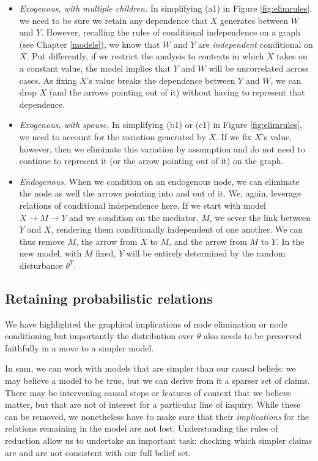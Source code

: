 \documentclass[
  12pt,
]{book}
\providecommand{\tightlist}{%
  \setlength{\itemsep}{0pt}\setlength{\parskip}{0pt}}
\begin{document}
\begin{itemize}
\tightlist
\item
  \emph{Exogenous, with multiple children.} In simplifying (a1) in Figure \ref{fig:elimrules}, we need to be sure we retain any dependence that \(X\) generates between \(W\) and \(Y\). However, recalling the rules of conditional independence on a graph (see Chapter \ref{models}), we know that \(W\) and \(Y\) are \emph{independent} conditional on \(X\). Put differently, if we restrict the analysis to contexts in which \(X\) takes on a constant value, the model implies that \(Y\) and \(W\) will be uncorrelated across cases. As fixing \(X\)'s value breaks the dependence between \(Y\) and \(W\), we can drop \(X\) (and the arrows pointing out of it) without having to represent that dependence.
\item
  \emph{Exogenous, with spouse.} In simplifying (b1) or (c1) in Figure \ref{fig:elimrules}, we need to account for the variation generated by \(X\). If we fix \(X\)'s value, however, then we eliminate this variation by assumption and do not need to continue to represent it (or the arrow pointing out of it) on the graph.
\item
  \emph{Endogenous.} When we condition on an endogenous node, we can eliminate the node as well the arrows pointing into and out of it. We, again, leverage relations of conditional independence here. If we start with model \(X \rightarrow M \rightarrow Y\) and we condition on the mediator, \(M\), we sever the link between \(Y\) and \(X\), rendering them conditionally independent of one another. We can thus remove \(M\), the arrow from \(X\) to \(M\), and the arrow from \(M\) to \(Y\). In the new model, with \(M\) fixed, \(Y\) will be entirely determined by the random disturbance \(\theta^{Y}\).
\end{itemize}

\hypertarget{retaining-probabilistic-relations}{%
\subsection{Retaining probabilistic relations}\label{retaining-probabilistic-relations}}

We have highlighted the graphical implications of node elimination or node conditioning but importantly the distribution over \(\theta\) also needs to be preserved faithfully in a move to a simpler model.

In sum, we can work with models that are simpler than our causal beliefs: we may believe a model to be true, but we can derive from it a sparser set of claims. There may be intervening causal steps or features of context that we believe matter, but that are not of interest for a particular line of inquiry. While these can be removed, we nonetheless have to make sure that their \emph{implications} for the relations remaining in the model are not lost. Understanding the rules of reduction allow us to undertake an important task: checking which simpler claims are and are not consistent with our full belief set.
\end{document}
